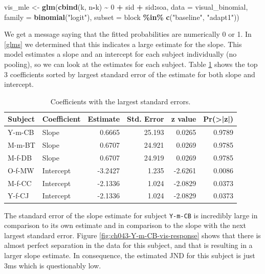 \documentclass[11pt, oneside, openany]{scrbook}
\newenvironment{Shaded}{\begin{snugshade}}{\end{snugshade}}
\newcommand{\AttributeTok}[1]{\textcolor[rgb]{0.13,0.29,0.53}{#1}}
\newcommand{\DecValTok}[1]{\textcolor[rgb]{0.00,0.00,0.81}{#1}}
\newcommand{\FunctionTok}[1]{\textcolor[rgb]{0.13,0.29,0.53}{\textbf{#1}}}
\newcommand{\NormalTok}[1]{#1}
\newcommand{\OtherTok}[1]{\textcolor[rgb]{0.56,0.35,0.01}{#1}}
\newcommand{\SpecialCharTok}[1]{\textcolor[rgb]{0.81,0.36,0.00}{\textbf{#1}}}
\newcommand{\StringTok}[1]{\textcolor[rgb]{0.31,0.60,0.02}{#1}}
\begin{document}
\begin{Shaded}
\begin{Highlighting}[]
\NormalTok{vis\_mle }\OtherTok{\textless{}{-}} \FunctionTok{glm}\NormalTok{(}\FunctionTok{cbind}\NormalTok{(k, n}\SpecialCharTok{{-}}\NormalTok{k) }\SpecialCharTok{\textasciitilde{}} \DecValTok{0} \SpecialCharTok{+}\NormalTok{ sid }\SpecialCharTok{+}\NormalTok{ sid}\SpecialCharTok{:}\NormalTok{soa,}
               \AttributeTok{data =}\NormalTok{ visual\_binomial, }
               \AttributeTok{family =} \FunctionTok{binomial}\NormalTok{(}\StringTok{"logit"}\NormalTok{),}
               \AttributeTok{subset =}\NormalTok{ block }\SpecialCharTok{\%in\%} \FunctionTok{c}\NormalTok{(}\StringTok{"baseline"}\NormalTok{, }\StringTok{"adapt1"}\NormalTok{))}
\end{Highlighting}
\end{Shaded}


We get a message saying that the fitted probabilities are numerically 0 or 1. In \ref{glms} we determined that this indicates a large estimate for the slope. This model estimates a slope and an intercept for each subject individually (no pooling), so we can look at the estimates for each subject. Table \ref{tab:ch043-Intensive-Oyster} shows the top 3 coefficients sorted by largest standard error of the estimate for both slope and intercept.

\begin{table}[!h]
\centering
\caption{\label{tab:ch043-Intensive-Oyster}Coefficients with the largest standard errors.}
\centering
\begin{tabular}[t]{llrrrr}
\toprule
Subject & Coefficient & Estimate & Std. Error & z value & Pr(>|z|)\\
\midrule
Y-m-CB & Slope & 0.6665 & 25.193 & 0.0265 & 0.9789\\
M-m-BT & Slope & 0.6707 & 24.921 & 0.0269 & 0.9785\\
M-f-DB & Slope & 0.6707 & 24.919 & 0.0269 & 0.9785\\
O-f-MW & Intercept & -3.2427 & 1.235 & -2.6261 & 0.0086\\
M-f-CC & Intercept & -2.1336 & 1.024 & -2.0829 & 0.0373\\
\addlinespace
Y-f-CJ & Intercept & -2.1336 & 1.024 & -2.0829 & 0.0373\\
\bottomrule
\end{tabular}
\end{table}

The standard error of the slope estimate for subject \texttt{Y-m-CB} is incredibly large in comparison to its own estimate and in comparison to the slope with the next largest standard error. Figure \ref{fig:ch043-Y-m-CB-vis-response} shows that there is almost perfect separation in the data for this subject, and that is resulting in a larger slope estimate. In consequence, the estimated JND for this subject is just 3ms which is questionably low.
\end{document}
